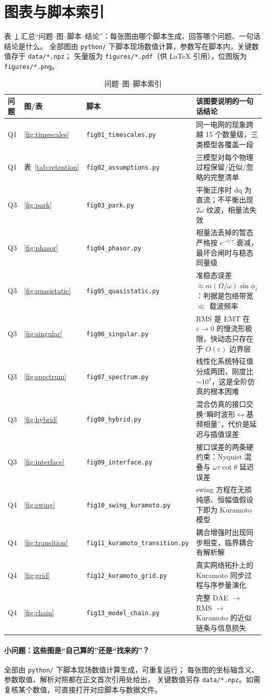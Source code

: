 \section{图表与脚本索引}
\label{sec:index}

表~\ref{tab:index} 汇总“问题--图--脚本--结论”：每张图由哪个脚本生成、回答哪个问题、一句话结论是什么。
全部图由 \texttt{python/} 下脚本现场数值计算，参数写在脚本内，关键数值存于 \texttt{data/*.npz}；
矢量版为 \texttt{figures/*.pdf}（供 LaTeX 引用），位图版为 \texttt{figures/*.png}。

\begin{table}[htbp]
\centering
\caption{问题--图--脚本索引}
\label{tab:index}
\small
\begin{tabularx}{\textwidth}{@{}lllX@{}}
\toprule
问题 & 图/表 & 脚本 & 该图要说明的一句话结论 \\
\midrule
Q1 & \ref{fig:timescales} & \texttt{fig01\_timescales.py} & 同一电网的现象跨越 15 个数量级，三类模型各覆盖一段 \\
Q1 & 表~\ref{tab:retention} & \texttt{fig02\_assumptions.py} & 三模型对每个物理过程保留/近似/忽略的完整清单 \\
Q3 & \ref{fig:park} & \texttt{fig03\_park.py} & 平衡正序时 dq 为直流；不平衡出现 $2\omega$ 纹波，相量法失效 \\
Q3 & \ref{fig:phasor} & \texttt{fig04\_phasor.py} & 相量法丢掉的暂态严格按 $e^{-t/\tau}$ 衰减，最坏合闸时与稳态同量级 \\
Q3 & \ref{fig:quasistatic} & \texttt{fig05\_quasistatic.py} & 准稳态误差 $\approx m(\Omega/\omega)\sin\phi_z$：判据是包络带宽 $\ll$ 载波频率 \\
Q3 & \ref{fig:singular} & \texttt{fig06\_singular.py} & RMS 是 EMT 在 $\varepsilon\to0$ 的慢流形极限，快动态只存在于 $O(\varepsilon)$ 边界层 \\
Q3 & \ref{fig:spectrum} & \texttt{fig07\_spectrum.py} & 线性化系统特征值分成两团，刚度比 $\sim10^4$，这是全阶仿真的根本困难 \\
Q3 & \ref{fig:hybrid} & \texttt{fig08\_hybrid.py} & 混合仿真的接口交换“瞬时波形$\leftrightarrow$基频相量”，代价是延迟与插值误差 \\
Q3 & \ref{fig:interface} & \texttt{fig09\_interface.py} & 接口误差的两条硬约束：Nyquist 混叠与 $\omega\tau\cot\theta$ 延迟误差 \\
Q4 & \ref{fig:swing} & \texttt{fig10\_swing\_kuramoto.py} & swing 方程在无损纯感、恒幅值假设下即为 Kuramoto 模型 \\
Q4 & \ref{fig:transition} & \texttt{fig11\_kuramoto\_transition.py} & 耦合增强时出现同步相变，临界耦合有解析解 \\
Q4 & \ref{fig:grid} & \texttt{fig12\_kuramoto\_grid.py} & 真实网络拓扑上的 Kuramoto 同步过程与序参量演化 \\
Q4 & \ref{fig:chain} & \texttt{fig13\_model\_chain.py} & 完整 DAE $\to$ RMS $\to$ Kuramoto 的近似链条与信息损失 \\
\bottomrule
\end{tabularx}
\end{table}

\paragraph{小问题：这些图是“自己算的”还是“找来的”？}
全部由 \texttt{python/} 下脚本现场数值计算生成，可重复运行；
每张图的坐标轴含义、参数取值、解析对照都在正文首次引用处给出，
关键数值另存 \texttt{data/*.npz}。如需复核某个数值，可直接打开对应脚本与数据文件。
